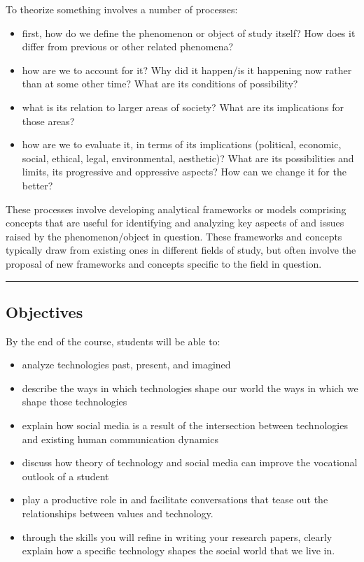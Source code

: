 \documentclass[
  letterpaper,
  DIV=11,
  numbers=noendperiod]{scrartcl}
\providecommand{\tightlist}{%
  \setlength{\itemsep}{0pt}\setlength{\parskip}{0pt}}\usepackage{longtable,booktabs,array}
\begin{document}
To theorize something involves a number of processes:

\begin{itemize}
\tightlist
\item
  first, how do we define the phenomenon or object of study itself? How
  does it differ from previous or other related phenomena?
\item
  how are we to account for it? Why did it happen/is it happening now
  rather than at some other time? What are its conditions of
  possibility?
\item
  what is its relation to larger areas of society? What are its
  implications for those areas?
\item
  how are we to evaluate it, in terms of its implications (political,
  economic, social, ethical, legal, environmental, aesthetic)? What are
  its possibilities and limits, its progressive and oppressive aspects?
  How can we change it for the better?
\end{itemize}

These processes involve developing analytical frameworks or models
comprising concepts that are useful for identifying and analyzing key
aspects of and issues raised by the phenomenon/object in question. These
frameworks and concepts typically draw from existing ones in different
fields of study, but often involve the proposal of new frameworks and
concepts specific to the field in question.

\begin{center}\rule{0.5\linewidth}{0.5pt}\end{center}

\hypertarget{objectives}{%
\subsection{Objectives}\label{objectives}}

By the end of the course, students will be able to:

\begin{itemize}
\tightlist
\item
  analyze technologies past, present, and imagined
\item
  describe the ways in which technologies shape our world the ways in
  which we shape those technologies
\item
  explain how social media is a result of the intersection between
  technologies and existing human communication dynamics
\item
  discuss how theory of technology and social media can improve the
  vocational outlook of a student
\item
  play a productive role in and facilitate conversations that tease out
  the relationships between values and technology.\\
\item
  through the skills you will refine in writing your research papers,
  clearly explain how a specific technology shapes the social world that
  we live in.
\end{itemize}
\end{document}
